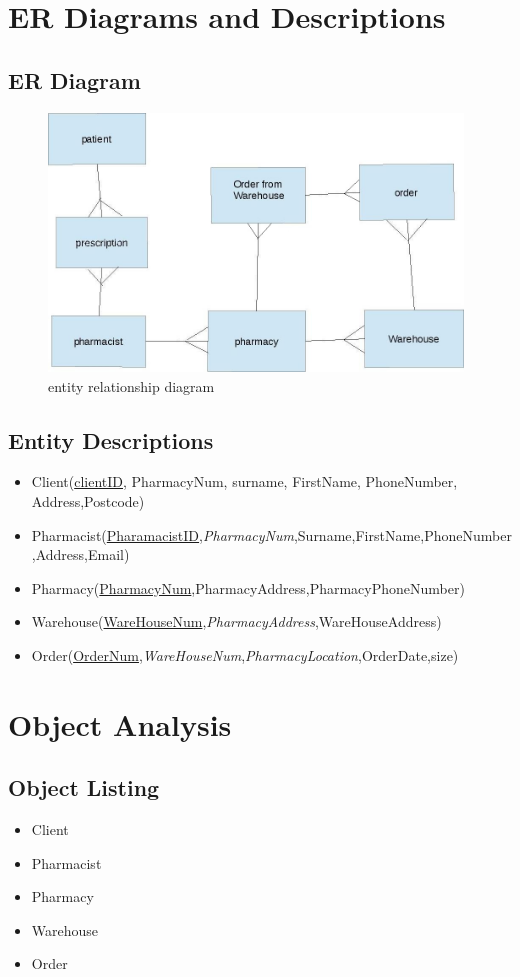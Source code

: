 \section{ER Diagrams and Descriptions}
\subsection{ER Diagram}
\begin{figure}[ht!]
\centering
\includegraphics[width=110mm]{table1.JPG}
\caption{entity relationship diagram \label{overflow}}
\end{figure}
\pagebreak
\subsection{Entity Descriptions}
\begin{itemize}
\item Client(\underline{clientID}, PharmacyNum, surname, FirstName, PhoneNumber, Address,Postcode)
\item Pharmacist(\underline{PharamacistID},\emph{PharmacyNum},Surname,FirstName,PhoneNumber,Address,Email)
\item Pharmacy(\underline{PharmacyNum},PharmacyAddress,PharmacyPhoneNumber)
\item Warehouse(\underline{WareHouseNum},\emph{PharmacyAddress},WareHouseAddress)
\item Order(\underline{OrderNum},\emph{WareHouseNum},\emph{PharmacyLocation},OrderDate,size)
\end{itemize}
\section{Object Analysis}

\subsection{Object Listing}
\begin{itemize}

\item Client
\item Pharmacist
\item Pharmacy
\item Warehouse
\item Order

\end{itemize}
